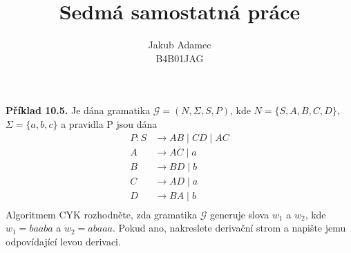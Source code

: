 \documentclass[11pt]{article}
\begin{document}

\newcommand\splitpage[2]{
      \begin{minipage}[t]{0.45\textwidth}#1
      \end{minipage}%
      \hfill
      \begin{minipage}[t]{0.45\textwidth}#2
      \end{minipage}
}
 
 
\title{\textbf{Sedmá samostatná práce}}
\author{Jakub Adamec\\ %
B4B01JAG} %

\maketitle

\noindent
\textbf{Příklad 10.5.} Je dána gramatika $\mathcal{G} = (N, \Sigma, S, P)$, kde $N = \{S, A, B, C, D\}$, $\Sigma = \{a,b,c\}$ a pravidla P jsou dána
\begin{align*}
    P:    S & \rightarrow AB \mid CD \mid AC \\
          A & \rightarrow AC \mid a \\
          B & \rightarrow BD \mid b \\ 
          C & \rightarrow AD \mid a \\
          D & \rightarrow BA \mid b \\
\end{align*}
Algoritmem CYK rozhodněte, zda gramatika $\mathcal{G}$ generuje slova $w_1$ a $w_2$, kde ${w_1 = baaba}$ a ${w_2 = abaaa}$. Pokud ano, nakreslete derivační strom a napište jemu odpovídající levou derivaci.
\\
\end{document}
